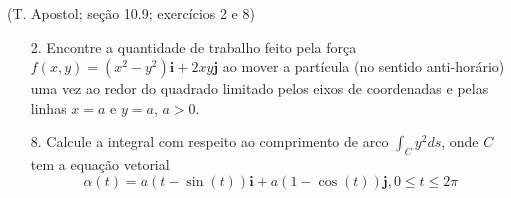 \documentclass[../main.tex]{subfiles}
\begin{document}
	\begin{exercicio}{2}
		(T. Apostol; seção 10.9; exercícios 2 e 8)
		
		\begin{enumerate}
			\item[2.] Encontre a quantidade de trabalho feito pela força $f(x,y)=(x^2-y^2)\textbf{i}+2xy\textbf{j}$ ao mover a partícula (no sentido anti-horário) uma vez ao redor do quadrado limitado pelos eixos de coordenadas e pelas linhas $x=a$ e $y=a$, $a>0$.
			\item[8.] Calcule a integral com respeito ao comprimento de arco $\int_C y^2 ds$, onde $C$ tem a equação vetorial
			\[
			\alpha(t)=a(t-\sin(t))\textbf{i} + a(1-\cos(t))\textbf{j}, 0\leq t\leq 2\pi
			\]
		\end{enumerate}
	\end{exercicio}
\end{document}
